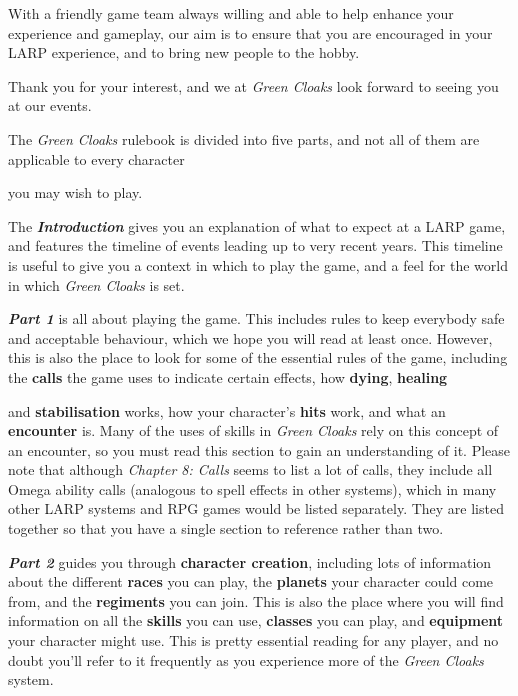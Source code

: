 With a friendly game team always willing and able to help enhance your experience and gameplay, our aim is to ensure that you are encouraged in your LARP experience, and to bring new people to the hobby.

Thank you for your interest, and we at \textit{Green Cloaks} look forward to seeing you at our events.

The \textit{Green Cloaks} rulebook is divided into five parts, and not all of them are applicable to every character

you may wish to play.

The \textbf{\textit{Introduction}} gives you an explanation of what to expect at a LARP game, and features the timeline of events leading up to very recent years. This timeline is useful to give you a context in which to play the game, and a feel for the world in which \textit{Green Cloaks} is set.

\textbf{\textit{Part 1}} is all about playing the game. This includes rules to keep everybody safe and acceptable behaviour, which we hope you will read at least once. However, this is also the place to look for some of the essential rules of the game, including the \textbf{calls} the game uses to indicate certain effects, how \textbf{dying}, \textbf{healing}

and \textbf{stabilisation} works, how your character's \textbf{hits} work, and what an \textbf{encounter} is. Many of the uses of skills in \textit{Green Cloaks} rely on this concept of an encounter, so you must read this section to gain an understanding of it. Please note that although \textit{Chapter 8: Calls} seems to list a lot of calls, they include all Omega ability calls (analogous to spell effects in other systems), which in many other LARP systems and RPG games would be listed separately. They are listed together so that you have a single section to reference rather than two.

\textbf{\textit{Part 2}} guides you through \textbf{character creation}, including lots of information about the different \textbf{races} you can play, the \textbf{planets} your character could come from, and the \textbf{regiments} you can join. This is also the place where you will find information on all the \textbf{skills} you can use, \textbf{classes} you can play, and \textbf{equipment} your character might use. This is pretty essential reading for any player, and no doubt you'll refer to it frequently as you experience more of the \textit{Green Cloaks} system.

